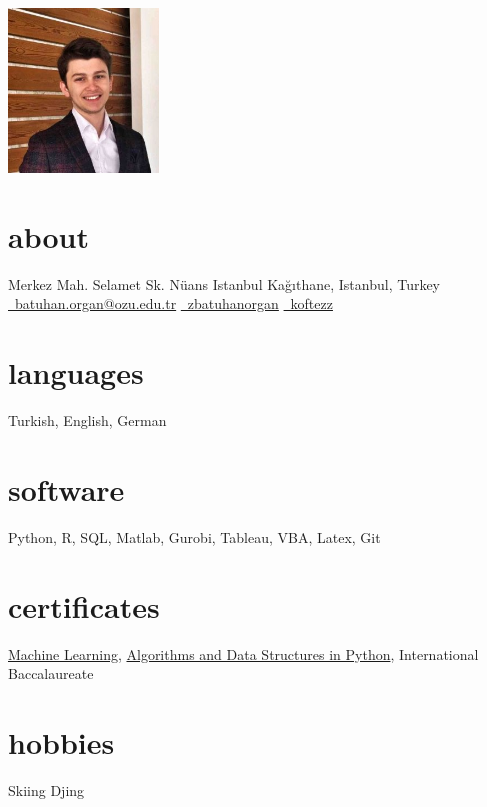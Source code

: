 \documentclass[]{zbatuhan-cv}
\begin{document}
      {%
      }

\begin{aside}
  \section{ \ }
    \hspace*{-1cm} \includegraphics[width=4cm]{batuhan - Copy_cut.png}
  \section{about}
    \hspace*{-1cm} Merkez Mah. Selamet Sk.
    Nüans Istanbul 
    Kağıthane, Istanbul, Turkey
   \hspace*{-2cm} \href{mailto:batuhan.organ@ozu.edu.tr}{\mail \ batuhan.organ@ozu.edu.tr}
     \href{https://www.linkedin.com/in/zbatuhanorgan}{\linkedin \ zbatuhanorgan}
     \href{https://github.com/koftezz}{\github \ koftezz}
    ~
  \section{languages}
    Turkish, English, German
    ~
  \section{software}
    Python, R, SQL, Matlab,
    Gurobi, Tableau, VBA, Latex, Git
    ~
  \section{certificates}
    \href{https://www.coursera.org/account/accomplishments/verify/A4W4M9RN8D36}{Machine Learning},
    \href{https://www.udemy.com/certificate/UC-PYMK9LRP/}{Algorithms and Data Structures in Python},
    International Baccalaureate
    ~
  \section{hobbies}
    Skiing
    Djing
\end{aside}
\end{document}
